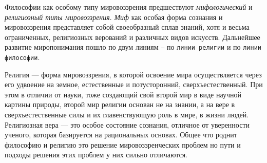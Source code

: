 \documentclass[12pt]{article}
\begin{document}
Философии как особому типу мировоззрения предшествуют \textit{мифологический} и \textit{религиозный типы мировоззрения}.
\textit{Миф} как особая форма сознания и мировоззрения представляет собой своеобразный сплав знаний, хотя и
весьма ограниченных, религиозных верований и различных видов искусств.
Дальнейшее развитие миропонимания пошло по двум линиям – по \texttt{линии религии} и по \texttt{линии философии}.

Религия --- форма мировоззрения, в которой освоение мира осуществляется через его удвоение на земное,
естественные и потусторонний, сверхъестественный. 
При этом в отличии от науки, тоже создающий свой второй мир в виде научной картины природы,
второй мир религии основан не на знании, а на вере в сверхъестественные силы и их главенствующую роль в мире,
в жизни людей. Религиозная вера --- это особое состояние сознания, отличное от уверенности ученого,
которая базируется на рациональных основах.
Общее что роднит философию и религию это решение мировоззренческих проблем но пути и подходы решения
этих проблем у них сильно отличаются.
\end{document}
